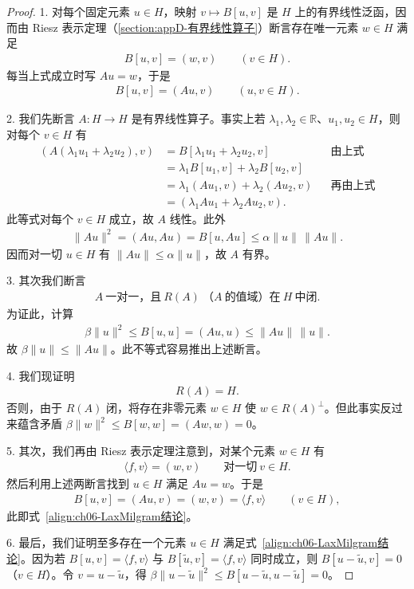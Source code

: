 \documentclass[../../main.tex]{subfiles}
\begin{document}
\begin{proof}
1. 对每个固定元素 $u\in H$，映射 $v\mapsto B[u,v]$ 是 $H$ 上的有界线性泛函，因而由 Riesz 表示定理（\cref{section:appD-有界线性算子}）断言存在唯一元素 $w\in H$ 满足
\begin{align}
B[u,v]=(w,v)\qquad (v\in H).
\end{align}
每当上式成立时写 $Au=w$，于是
\begin{align}
B[u,v]=(Au,v)\qquad (u,v\in H).
\end{align}

2. 我们先断言 $A:H\to H$ 是有界线性算子。事实上若 $\lambda_{1},\lambda_{2}\in\mathbb{R}$、$u_{1},u_{2}\in H$，则对每个 $v\in H$ 有
\begin{align*}
(A(\lambda_{1}u_{1}+\lambda_{2}u_{2}),v)
&=B[\lambda_{1}u_{1}+\lambda_{2}u_{2},v] &&\text{由上式}\\
&=\lambda_{1}B[u_{1},v]+\lambda_{2}B[u_{2},v]\\
&=\lambda_{1}(Au_{1},v)+\lambda_{2}(Au_{2},v) &&\text{再由上式}\\
&=(\lambda_{1}Au_{1}+\lambda_{2}Au_{2},v).
\end{align*}
此等式对每个 $v\in H$ 成立，故 $A$ 线性。此外
\begin{align*}
\|Au\|^{2}=(Au,Au)=B[u,Au]\leqslant\alpha\|u\|\,\|Au\|.
\end{align*}
因而对一切 $u\in H$ 有 $\|Au\|\leqslant\alpha\|u\|$，故 $A$ 有界。

3. 其次我们断言
\begin{align}
A\ \text{一对一，且}\ R(A)\ \text{（}A\ \text{的值域）在}\ H\ \text{中闭}.
\end{align}
为证此，计算
\begin{align*}
\beta\|u\|^{2}\leqslant B[u,u]=(Au,u)\leqslant\|Au\|\,\|u\|.
\end{align*}
故 $\beta\|u\|\leqslant\|Au\|$。此不等式容易推出上述断言。

4. 我们现证明
\begin{align}
R(A)=H.
\end{align}
否则，由于 $R(A)$ 闭，将存在非零元素 $w\in H$ 使 $w\in R(A)^{\perp}$。但此事实反过来蕴含矛盾 $\beta\|w\|^{2}\leqslant B[w,w]=(Aw,w)=0$。

5. 其次，我们再由 Riesz 表示定理注意到，对某个元素 $w\in H$ 有
\begin{align*}
\langle f,v\rangle=(w,v)\qquad\text{对一切}\ v\in H.
\end{align*}
然后利用上述两断言找到 $u\in H$ 满足 $Au=w$。于是
\begin{align}\label{align:ch06-LaxMilgram结论}
B[u,v]=(Au,v)=(w,v)=\langle f,v\rangle\qquad (v\in H),
\end{align}
此即式~\eqref{align:ch06-LaxMilgram结论}。

6. 最后，我们证明至多存在一个元素 $u\in H$ 满足式~\eqref{align:ch06-LaxMilgram结论}。因为若 $B[u,v]=\langle f,v\rangle$ 与 $B[\widetilde{u},v]=\langle f,v\rangle$ 同时成立，则 $B[u-\widetilde{u},v]=0$（$v\in H$）。令 $v=u-\widetilde{u}$，得 $\beta\|u-\widetilde{u}\|^{2}\leqslant B[u-\widetilde{u},u-\widetilde{u}]=0$。
\end{proof}
\end{document}
